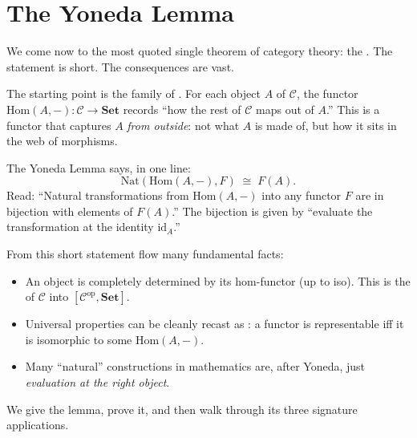 \chapter{The Yoneda Lemma}

\begin{overviewbox}
We come now to the most quoted single theorem of category theory:
the . The statement is short. The consequences are
vast.

The starting point is the family of . For each object
$A$ of $\mathcal{C}$, the functor $\mathrm{Hom}(A, -) : \mathcal{C} \to
\mathbf{Set}$ records ``how the rest of $\mathcal{C}$ maps out of $A$.''
This is a functor that captures $A$ \emph{from outside}: not what $A$ is
made of, but how it sits in the web of morphisms.

The Yoneda Lemma says, in one line:
\begin{equation*}
  \mathrm{Nat}(\mathrm{Hom}(A, -), F) \;\cong\; F(A).
\end{equation*}
Read: ``Natural transformations from $\mathrm{Hom}(A, -)$ into any functor
$F$ are in bijection with elements of $F(A)$.'' The bijection is given by
``evaluate the transformation at the identity $\mathrm{id}_A$.''

From this short statement flow many fundamental facts:
\begin{itemize}
  \item An object is completely determined by its hom-functor (up to iso).
        This is the  of $\mathcal{C}$ into
        $[\mathcal{C}^{\mathrm{op}}, \mathbf{Set}]$.
  \item Universal properties can be cleanly recast as
        : a functor is representable iff it is
        isomorphic to some $\mathrm{Hom}(A, -)$.
  \item Many ``natural'' constructions in mathematics are, after Yoneda,
        just \emph{evaluation at the right object}.
\end{itemize}
We give the lemma, prove it, and then walk through its three signature
applications.
\end{overviewbox}


